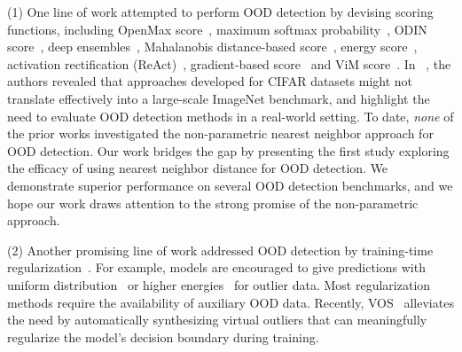 \documentclass[nohyperref]{article}
\theoremstyle{plain}
\theoremstyle{definition}
\theoremstyle{remark}
\begin{document}
\vspace{0.1cm}
(1) One line of work attempted to perform OOD detection by devising scoring functions, including OpenMax score~\citep{openworld}, maximum softmax probability~\citep{Kevin}, ODIN score~\citep{liang2018enhancing}, deep ensembles~\citep{lakshminarayanan2017simple}, Mahalanobis
distance-based score~\citep{lee2018simple}, energy score~\citep{liu2020energy,lin2021mood, wang2021canmulti, morteza2022provable}, activation rectification (ReAct)~\cite{sun2021react},  gradient-based score~\citep{huang2021importance} and ViM score~\cite{wang2022vim}.
In ~\citet{huang2021mos}, the authors revealed that approaches developed for CIFAR datasets might not translate effectively into a large-scale ImageNet benchmark, 
and highlight the need to evaluate OOD detection methods in a real-world setting.
To date, \emph{none} of the prior works investigated the non-parametric nearest neighbor approach for OOD detection. Our work bridges the gap by presenting the first study exploring the efficacy of using nearest neighbor distance for OOD detection.
We demonstrate superior performance on several OOD detection benchmarks, and we hope our work draws attention to the strong promise of the non-parametric approach.  


\vspace{0.2cm}
(2) Another promising line of work addressed OOD detection by training-time regularization~\cite{lee2017training, bevandic2018discriminative,  malinin2018predictive, hendrycks2018deep,  geifman2019selectivenet, hein2019relu, meinke2019towards, mohseni2020self, liu2020energy, jeong2020ood, van2020uncertainty, yang2021semantic, chen2021atom, hongxin2022logitnorm, ming2022posterior, katzsamuels2022training}.
For example, models are encouraged to give predictions with uniform distribution~\cite{lee2017training,hendrycks2018deep} or higher energies~\cite{liu2020energy, ming2022posterior, du2022unknown, katzsamuels2022training} for outlier data. Most regularization methods require the availability of auxiliary OOD
data. Recently, VOS~\cite{du2022towards} alleviates the need by automatically synthesizing virtual outliers that can meaningfully regularize the model's decision boundary during training. 
\end{document}
